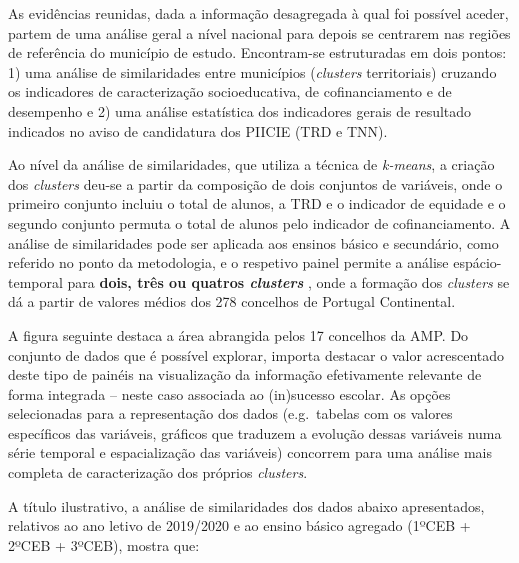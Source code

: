 \documentclass[
]{book}
\begin{document}
As evidências reunidas, dada a informação desagregada à qual foi possível aceder, partem de uma análise geral a nível nacional para depois se centrarem nas regiões de referência do município de estudo. Encontram-se estruturadas em dois pontos: 1) uma análise de similaridades entre municípios (\emph{clusters} territoriais) cruzando os indicadores de caracterização socioeducativa, de cofinanciamento e de desempenho e 2) uma análise estatística dos indicadores gerais de resultado indicados no aviso de candidatura dos PIICIE (TRD e TNN).

Ao nível da análise de similaridades, que utiliza a técnica de \emph{k-means}, a criação dos \emph{clusters} deu-se a partir da composição de dois conjuntos de variáveis, onde o primeiro conjunto incluiu o total de alunos, a TRD e o indicador de equidade e o segundo conjunto permuta o total de alunos pelo indicador de cofinanciamento. A análise de similaridades pode ser aplicada aos ensinos básico e secundário, como referido no ponto da metodologia, e o respetivo painel permite a análise espácio-temporal para \textbf{dois, três ou quatros \emph{clusters} }, onde a formação dos \emph{clusters} se dá a partir de valores médios dos 278 concelhos de Portugal Continental.

A figura seguinte destaca a área abrangida pelos 17 concelhos da AMP. Do conjunto de dados que é possível explorar, importa destacar o valor acrescentado deste tipo de painéis na visualização da informação efetivamente relevante de forma integrada -- neste caso associada ao (in)sucesso escolar. As opções selecionadas para a representação dos dados (e.g.~tabelas com os valores específicos das variáveis, gráficos que traduzem a evolução dessas variáveis numa série temporal e espacialização das variáveis) concorrem para uma análise mais completa de caracterização dos próprios \emph{clusters}.

A título ilustrativo, a análise de similaridades dos dados abaixo apresentados, relativos ao ano letivo de 2019/2020 e ao ensino básico agregado (1ºCEB + 2ºCEB + 3ºCEB), mostra que:
\end{document}
